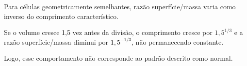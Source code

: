 Para células geometricamente semelhantes, razão superfície/massa varia como inverso do comprimento característico.

Se o volume cresce 1,5 vez antes da divisão, o comprimento cresce por $1{,}5^{1/3}$ e a razão superfície/massa diminui por $1{,}5^{-1/3}$, não permanecendo constante.

Logo, esse comportamento não corresponde ao padrão descrito como normal.

